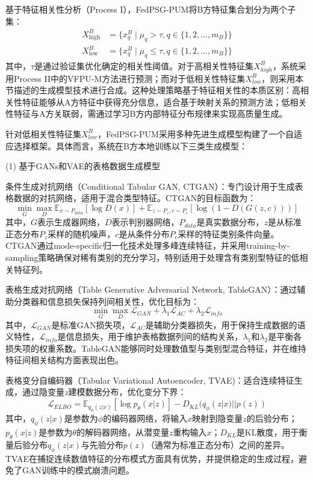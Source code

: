 基于特征相关性分析（Process I），FedPSG-PUM将B方特征集合划分为两个子集：
\begin{equation}
	\begin{split}
		X^B_{\text{high}} &= \{x^B_q \mid \mu_q > \tau, q \in \{1,2,...,m_B\}\} \\
		X^B_{\text{low}} &= \{x^B_q \mid \mu_q \leq \tau, q \in \{1,2,...,m_B\}\}
	\end{split}
\end{equation}
其中，$\tau$是通过验证集优化确定的相关性阈值。对于高相关性特征集$X^B_{high}$，系统采用Process II中的VFPU-M方法进行预测；而对于低相关性特征集$X^B_{low}$，则采用本节描述的生成模型技术进行合成。这种处理策略基于特征相关性的本质区别：高相关性特征能够从A方特征中获得充分信息，适合基于映射关系的预测方法；低相关性特征与A方关联弱，需通过学习B方内部特征分布规律来实现高质量生成。

针对低相关性特征集$X^B_{low}$，FedPSG-PUM采用多种先进生成模型构建了一个自适应选择框架。具体而言，系统在B方本地训练以下三类生成模型：

(1) 基于GANs和VAE的表格数据生成模型

条件生成对抗网络（Conditional Tabular GAN, CTGAN）：专门设计用于生成表格数据的对抗网络，适用于混合类型特征。CTGAN的目标函数为：
\begin{equation}
	\min_G \max_D \mathbb{E}_{x \sim P_{data}}[\log D(x)] + \mathbb{E}_{z \sim P_z, c \sim P_c}[\log(1 - D(G(z, c)))]
\end{equation}
其中，$G$表示生成器网络，$D$表示判别器网络，$P_{data}$是真实数据分布，$z$是从标准正态分布$P_z$采样的随机噪声，$c$是从条件分布$P_c$采样的特征类别条件向量。CTGAN通过mode-specific归一化技术处理多峰连续特征，并采用training-by-sampling策略确保对稀有类别的充分学习，特别适用于处理含有类别型特征的低相关特征列。

表格生成对抗网络（Table Generative Adversarial Network, TableGAN）：通过辅助分类器和信息损失保持列间相关性，优化目标为：
\begin{equation}
	\min_G \max_D \mathcal{L}_{GAN} + \lambda_1 \mathcal{L}_{AC} + \lambda_2 \mathcal{L}_{info}
\end{equation}
其中，$\mathcal{L}_{GAN}$是标准GAN损失项，$\mathcal{L}_{AC}$是辅助分类器损失，用于保持生成数据的语义特性，$\mathcal{L}_{info}$是信息损失，用于维护表格数据列间的结构关系，$\lambda_1$和$\lambda_2$是平衡各损失项的权重系数。TableGAN能够同时处理数值型与类别型混合特征，并在维持特征间相关结构方面表现出色。

表格变分自编码器（Tabular Variational Autoencoder, TVAE)：适合连续特征生成，通过隐变量$z$建模数据分布，优化变分下界：
\begin{equation}
	\mathcal{L}_{ELBO} = \mathbb{E}_{q_\phi(z|x)}[\log p_\theta(x|z)] - D_{KL}(q_\phi(z|x) || p(z))
\end{equation}
其中，$q_\phi(z|x)$是参数为$\phi$的编码器网络，将输入$x$映射到隐变量$z$的后验分布；$p_\theta(x|z)$是参数为$\theta$的解码器网络，从潜变量$z$重构输入$x$；$D_{KL}$是KL散度，用于衡量后验分布$q_\phi(z|x)$与先验分布$p(z)$（通常为标准正态分布）之间的差异。TVAE在捕捉连续数值特征的分布模式方面具有优势，并提供稳定的生成过程，避免了GAN训练中的模式崩溃问题。

